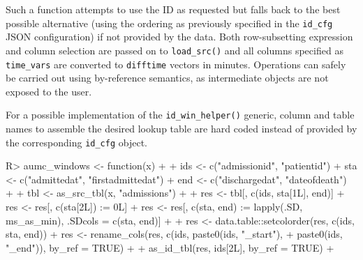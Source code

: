 \documentclass[
  notitle]{jss}
\begin{document}
\begin{CodeChunk}
\end{CodeChunk}

Such a function attempts to use the ID as requested but falls back to
the best possible alternative (using the ordering as previously
specified in the \texttt{id\_cfg} JSON configuration) if not provided by
the data. Both row-subsetting expression and column selection are passed
on to \texttt{load\_src()} and all columns specified as
\texttt{time\_vars} are converted to \texttt{difftime} vectors in
minutes. Operations can safely be carried out using by-reference
semantics, as intermediate objects are not exposed to the user.

For a possible implementation of the \texttt{id\_win\_helper()} generic,
column and table names to assemble the desired lookup table are hard
coded instead of provided by the corresponding \texttt{id\_cfg} object.

\begin{CodeChunk}
\begin{CodeInput}
R> aumc_windows <- function(x) {
+ 
+   ids <- c("admissionid", "patientid")
+   sta <- c("admittedat", "firstadmittedat")
+   end <- c("dischargedat", "dateofdeath")
+ 
+   tbl <- as_src_tbl(x, "admissions")
+ 
+   res <- tbl[, c(ids, sta[1L], end)]
+   res <- res[, c(sta[2L]) := 0L]
+   res <- res[, c(sta, end) := lapply(.SD, ms_as_min), .SDcols = c(sta, end)]
+ 
+   res <- data.table::setcolorder(res, c(ids, sta, end))
+   res <- rename_cols(res, c(ids, paste0(ids, "_start"),
+                                  paste0(ids, "_end")), by_ref = TRUE)
+ 
+   as_id_tbl(res, ids[2L], by_ref = TRUE)
+ }
\end{CodeInput}
\end{CodeChunk}
\end{document}
